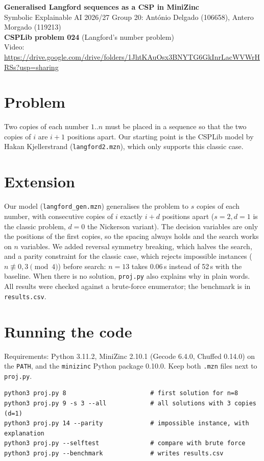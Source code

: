 \documentclass[10pt,a4paper]{article}
\begin{document}
\sloppy

{\large\bfseries Generalised Langford sequences as a CSP in MiniZinc}\\[1pt]
Symbolic Explainable AI 2026/27 \quad Group 20: António Delgado (106658), Antero Morgado (119213)\\
\textbf{CSPLib problem 024} (Langford's number problem)\\
Video: {\small\url{https://drive.google.com/drive/folders/1JhtKAuOsx3BNYTG6GkInrLacWVWrHRSs?usp=sharing}}

\section{Problem}
Two copies of each number $1..n$ must be placed in a sequence so that the two copies of $i$ are $i+1$ positions apart. Our starting point is the CSPLib model by Hakan Kjellerstrand (\texttt{langford2.mzn}), which only supports this classic case.

\section{Extension}
Our model (\texttt{langford\_gen.mzn}) generalises the problem to $s$ copies of each number, with consecutive copies of $i$ exactly $i+d$ positions apart ($s=2,d=1$ is the classic problem, $d=0$ the Nickerson variant). The decision variables are only the positions of the first copies, so the spacing always holds and the search works on $n$ variables. We added reversal symmetry breaking, which halves the search, and a parity constraint for the classic case, which rejects impossible instances ($n\not\equiv0,3\pmod4$) before search: $n=13$ takes 0.06\,s instead of 52\,s with the baseline. When there is no solution, \texttt{proj.py} also explains why in plain words. All results were checked against a brute-force enumerator; the benchmark is in \texttt{results.csv}.

\section{Running the code}
Requirements: Python 3.11.2, MiniZinc 2.10.1 (Gecode 6.4.0, Chuffed 0.14.0) on the \texttt{PATH}, and the \texttt{minizinc} Python package 0.10.0. Keep both \texttt{.mzn} files next to \texttt{proj.py}.
\vspace{-3pt}
{\footnotesize
\begin{verbatim}
python3 proj.py 8                       # first solution for n=8
python3 proj.py 9 -s 3 --all            # all solutions with 3 copies (d=1)
python3 proj.py 14 --parity             # impossible instance, with explanation
python3 proj.py --selftest              # compare with brute force
python3 proj.py --benchmark             # writes results.csv
\end{verbatim}}
\vspace{-8pt}
\end{document}
